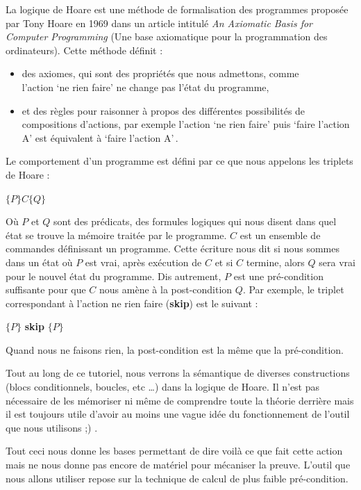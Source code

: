 \documentclass[12pt,francais,]{scrbook}
\providecommand{\tightlist}{%
  \setlength{\itemsep}{0pt}\setlength{\parskip}{0pt}}
\begin{document}
La logique de Hoare est une méthode de formalisation des programmes
proposée par Tony Hoare en 1969 dans un article intitulé \emph{An
Axiomatic Basis for Computer Programming} (Une base axiomatique pour la
programmation des ordinateurs). Cette méthode définit :

\begin{itemize}
\tightlist
\item
  des axiomes, qui sont des propriétés que nous admettons, comme\\
  \og{}l'action `ne rien faire' ne change pas l'état du programme\fg{},
\item
  et des règles pour raisonner à propos des différentes possibilités de
  compositions d'actions, par exemple \og{}l'action `ne rien faire' puis
  `faire l'action A' est équivalent à `faire l'action A'\,\fg{}.
\end{itemize}

Le comportement d'un programme est défini par ce que nous appelons les
triplets de Hoare :

\begin{center} \(\{P\} C \{Q\}\) \end{center}

Où \(P\) et \(Q\) sont des prédicats, des formules logiques qui nous
disent dans quel état se trouve la mémoire traitée par le programme.
\(C\) est un ensemble de commandes définissant un programme. Cette
écriture nous dit \og{}si nous sommes dans un état où \(P\) est vrai, après
exécution de \(C\) et si \(C\) termine, alors \(Q\) sera vrai pour le
nouvel état du programme\fg{}. Dis autrement, \(P\) est une pré-condition
suffisante pour que \(C\) nous amène à la post-condition \(Q\). Par
exemple, le triplet correspondant à l'action \og{}ne rien faire\fg{}
(\textbf{skip}) est le suivant :

\begin{center} \(\{P\}\) \textbf{skip} \(\{P\}\) \end{center}

Quand nous ne faisons rien, la post-condition est la même que la
pré-condition.

Tout au long de ce tutoriel, nous verrons la sémantique de diverses
constructions (blocs conditionnels, boucles, etc \ldots{}) dans la
logique de Hoare. Il n'est pas nécessaire de les mémoriser ni même de
comprendre toute la théorie derrière mais il est toujours utile d'avoir
au moins une vague idée du fonctionnement de l'outil que nous utilisons
;) .

Tout ceci nous donne les bases permettant de dire \og{}voilà ce que fait
cette action\fg{} mais ne nous donne pas encore de matériel pour mécaniser
la preuve. L'outil que nous allons utiliser repose sur la technique de
calcul de plus faible pré-condition.
\end{document}
